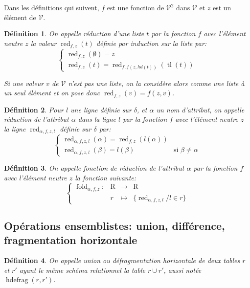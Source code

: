 \documentclass[french]{article}
\DeclareMathOperator{\R}{R}
\DeclareMathOperator{\redu}{red}
\DeclareMathOperator{\tail}{tl}
\DeclareMathOperator{\hdefrag}{hdefrag}
\newcommand{\val}{\mathcal{V}}
\newcommand{\fold}[3]{\operatorname{fold}_{#1, #2, #3}}
\newcommand{\foldAlphafz}{\fold{\alpha}{f}{z}}
\newtheorem{defi}{Définition}
\begin{document}
Dans les définitions qui suivent, $f$ est une fonction de $\val^2$ dans $\val$
et $z$ est un élément de $\val$.

\begin{defi}
	On appelle
	\emph{réduction d'une liste $t$ par la fonction $f$ avec l'élément neutre $z$}
	la valeur $\redu_{f, z}(t)$ définie par induction sur la liste par:
	$$
	\left\lbrace
	\begin{array}{l}
	\redu_{f,z}(\emptyset) = z \\
	\redu_{f,z}(t) = \redu_{f , f(z, hd(t))}(\tail(t))
	\end{array}
	\right.
	$$
	
	Si une valeur $v$ de $\val$ n'est pas une liste,
	on la considère alors comme une liste à un seul
	élément et on pose donc $\redu_{f,z}(v) = f(z,v)$.
\end{defi}

\begin{defi}
	Pour $l$ une ligne définie sur $\delta$,
	et $\alpha$ un nom d'attribut,
	on appelle
	\emph{réduction de l'attribut $\alpha$ dans la ligne $l$ 
		par la fonction $f$ avec l'élément neutre $z$}
	la ligne $\redu_{\alpha, f, z, l}$ définie sur $\delta$ par:
	$$
	\left\lbrace
	\begin{array}{ll}
	\redu_{\alpha, f, z, l}(\alpha) = \redu_{f,z}(l(\alpha)) & \\
	\redu_{\alpha, f, z, l}(\beta) = l(\beta) & \text{si $\beta \neq \alpha$}
	\end{array}
	\right.
	$$
\end{defi}

\begin{defi}
	On appelle \emph{fonction de réduction de l'attribut $\alpha$
		par la fonction $f$ avec l'élément neutre $z$} la fonction suivante:
	$$
	\left\lbrace
	\begin{array}{llcl}
	\foldAlphafz : & \R & \rightarrow & \R \\
				& r 	& \mapsto & \{ \redu_{\alpha, f, z, l} / l\in r \}
	\end{array}
	\right.
	$$
\end{defi}

\subsection*{Opérations ensemblistes: union, différence, fragmentation horizontale}
\begin{defi}
	On appelle \emph{union} ou \emph{défragmentation horizontale}
	de deux tables $r$ et $r'$ ayant le même schéma relationnel
	la table $r \cup r'$, aussi notée $\hdefrag(r, r')$.
\end{defi}
\end{document}
